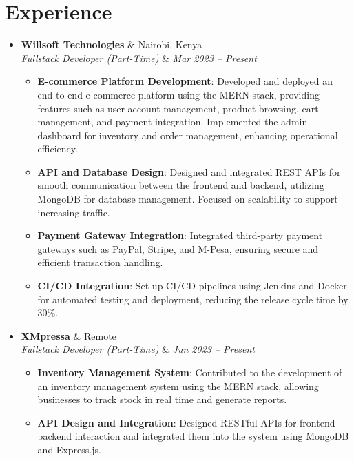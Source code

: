 \documentclass[letterpaper,11pt]{article}
\newcommand{\resumeItem}[2]{
  \item\small{
    \textbf{#1}{: #2 \vspace{-2pt}}
  }
}
\newcommand{\resumeSubheading}[4]{
  \vspace{-1pt}\item
  \textbf{#1} & #2 \\
  \textit{\small#3} & \textit{\small #4} 
}
\newcommand{\resumeSubHeadingListStart}{\begin{itemize}[leftmargin=*]}
\newcommand{\resumeSubHeadingListEnd}{\end{itemize}}
\newcommand{\resumeItemListStart}{\begin{itemize}}
\newcommand{\resumeItemListEnd}{\end{itemize}\vspace{-5pt}}
\begin{document}
\section{Experience}
  \resumeSubHeadingListStart

    \resumeSubheading
      {Willsoft Technologies}{Nairobi, Kenya}
      {Fullstack Developer (Part-Time)}{Mar 2023 -- Present}
      \resumeItemListStart
        \resumeItem{E-commerce Platform Development}
          {Developed and deployed an end-to-end e-commerce platform using the MERN stack, providing features such as user account management, product browsing, cart management, and payment integration. Implemented the admin dashboard for inventory and order management, enhancing operational efficiency.}
        \resumeItem{API and Database Design}
          {Designed and integrated REST APIs for smooth communication between the frontend and backend, utilizing MongoDB for database management. Focused on scalability to support increasing traffic.}
        \resumeItem{Payment Gateway Integration}
          {Integrated third-party payment gateways such as PayPal, Stripe, and M-Pesa, ensuring secure and efficient transaction handling.}
        \resumeItem{CI/CD Integration}
          {Set up CI/CD pipelines using Jenkins and Docker for automated testing and deployment, reducing the release cycle time by 30\%.}
      \resumeItemListEnd

    \resumeSubheading
      {XMpressa}{Remote}
      {Fullstack Developer (Part-Time)}{Jun 2023 -- Present}
      \resumeItemListStart
        \resumeItem{Inventory Management System}
          {Contributed to the development of an inventory management system using the MERN stack, allowing businesses to track stock in real time and generate reports.}
        \resumeItem{API Design and Integration}
          {Designed RESTful APIs for frontend-backend interaction and integrated them into the system using MongoDB and Express.js.}
      \resumeItemListEnd

  \resumeSubHeadingListEnd

\end{document}
